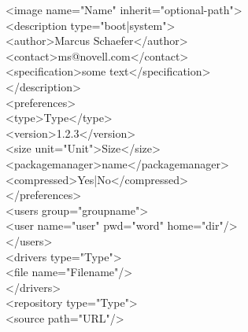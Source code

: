 \begin{itemize}
      \begin{Command}{13cm}
      <image name="Name" inherit="optional-path">\\
      \hspace*{1cm}<description type="boot|system">\\
      \hspace*{2cm}<author>Marcus Schaefer</author>\\
      \hspace*{2cm}<contact>ms@novell.com</contact>\\
      \hspace*{2cm}<specification>some text</specification>\\
      \hspace*{1cm}</description>\\
      \hspace*{1cm}<preferences>\\
      \hspace*{2cm}<type>Type</type>\\
      \hspace*{2cm}<version>1.2.3</version>\\
      \hspace*{2cm}<size unit="Unit">Size</size>\\
      \hspace*{2cm}<packagemanager>name</packagemanager>\\
      \hspace*{2cm}<compressed>Yes|No</compressed>\\
      \hspace*{1cm}</preferences>\\
      \hspace*{1cm}<users group="groupname">\\
      \hspace*{2cm}<user name="user" pwd="word" home="dir"/>\\
      \hspace*{1cm}</users>\\
      \hspace*{1cm}<drivers type="Type">\\
      \hspace*{2cm}<file name="Filename"/>\\
      \hspace*{1cm}</drivers>\\
      \hspace*{1cm}<repository type="Type">\\
      \hspace*{2cm}<source path="URL"/>\\

\end{Command}
\end{itemize}
